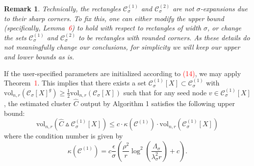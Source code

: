 \documentclass[11pt,twoside]{article}
\newtheorem*{remark}{Remark}
\newcommand{\set}[1]{\left\{#1\right\}}
\newcommand{\vol}{\mathrm{vol}}
\newcommand{\1}{\mathbf{1}}
\newcommand{\dist}{\mathrm{dist}}
\newcommand{\Xbf}{X}             %
\newcommand{\Pbb}{\mathbb{P}}
\newcommand{\Cbb}{\mathbb{C}}
\newcommand{\Cset}{\mathcal{C}}
\newcommand{\Csig}{\Cset_{\sigma}}
\begin{document}

\begin{remark}Technically, the rectangles $\Csig^{(1)}$ and $\Csig^{(2)}$ are not $\sigma$-expansions due to their sharp corners. To fix this, one can either modify the upper bound (specifically, Lemma~\textcolor{red}{6}) to hold with respect to rectangles of width $\sigma$, or change the sets $\Csig^{(1)}$ and $\Csig^{(2)}$ to be rectangles with rounded corners. As these details do not meaningfully change our conclusions, for simplicity we will keep our upper and lower bounds as is.
\end{remark}

If the user-specified parameters are initialized according to \textcolor{red}{(14)}, we may apply Theorem~\textcolor{red}{1}. This implies that there exists a set $\Csig^{(1)}[\Xbf] \subset \Csig^{(1)}$ with $\vol_{n,r}(\Csig[\Xbf]^g) \geq \frac{1}{2}\vol_{n,r}(\Csig[\Xbf])$ such that for any seed node $v \in \Csig^{(1)}[\Xbf]$, the estimated cluster $\widehat{C}$ output by Algorithm 1 satisfies the following upper bound:
\begin{equation*}
\vol_{n,r}(\widehat{C} \vartriangle \Csig^{(1)}[\Xbf]) \leq c \cdot \kappa(\Cset^{(1)}) \cdot \vol_{n,r}(\Csig^{(1)}[\Xbf])
\end{equation*}
where the condition number is given by
\begin{equation*}
\kappa(\Cset^{(1)}) = c \frac{\epsilon}{\sigma}\left(\frac{\rho^2}{r}\log^2\left(\frac{\Lambda_{\sigma}}{\lambda_{\sigma}^2r}\right) + c\right).
\end{equation*}
\end{document}
